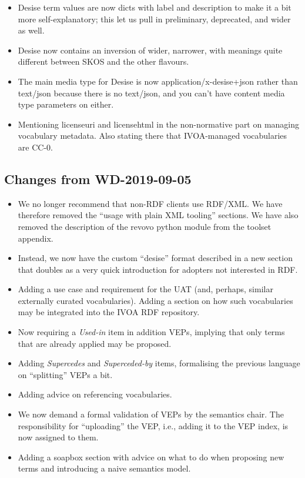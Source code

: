 \documentclass[11pt,a4paper]{ivoa}
\begin{document}
\begin{itemize}
\item Desise term values are now dicts with label and description to
make it a bit more self-explanatory; this let us pull in preliminary,
deprecated, and wider as well.
\item Desise now contains an inversion of wider, narrower, with meanings
quite different between SKOS and the other flavours.
\item The main media type for Desise is now application/x-desise+json rather 
than text/json because there is no text/json, and you can't have
content media type parameters on either.
\item Mentioning licenseuri and licensehtml in the non-normative part on
managing vocabulary metadata. Also stating there that IVOA-managed
vocabularies are CC-0.
\end{itemize}


\subsection{Changes from WD-2019-09-05}

\begin{itemize}
\item We no longer recommend that non-RDF clients use RDF/XML.  We have
therefore removed the ``usage with plain XML tooling'' sections.  We
have also removed the description of the revovo python module from the
toolset appendix.

\item Instead, we now have the custom ``desise'' format described in a
new section that doubles as a very quick introduction for adopters not
interested in RDF.

\item Adding a use case and requirement for the UAT (and, perhaps,
similar externally curated vocabularies).  Adding a section on how
such vocabularies may be integrated into the IVOA RDF repository.

\item Now requiring a \emph{Used-in} item in addition VEPs, implying
that only terms that are already applied may be proposed.

\item Adding \emph{Supercedes} and \emph{Superceded-by} items,
formalising the previous language on ``splitting'' VEPs a bit.

\item Adding advice on referencing vocabularies.

\item We now demand a formal validation of VEPs by the semantics chair.
The responsibility for ``uploading'' the VEP, i.e., adding it to the VEP
index, is now assigned to them.

\item Adding a soapbox section with advice on what to do when proposing
new terms and introducing a naive semantics model.
\end{itemize}


\end{document}
